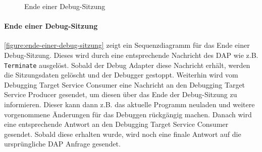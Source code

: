 \begin{figure}[tbp]
    \centering
    \caption{Ende einer Debug-Sitzung}
    \label{figure:ende-einer-debug-sitzung}
\end{figure}

\paragraph{Ende einer Debug-Sitzung} \autoref{figure:ende-einer-debug-sitzung} zeigt ein Sequenzdiagramm für das Ende einer Debug-Sitzung. Dieses wird durch eine entsprechende Nachricht des \ac{DAP} wie z.B. \texttt{Terminate} ausgelöst. Sobald der Debug Adapter diese Nachricht erhält, werden die Sitzungsdaten gelöscht und der Debugger gestoppt. Weiterhin wird vom Debugging Target Service Consumer eine Nachricht an den Debugging Target Service Producer gesendet, um diesen über das Ende der Debug-Sitzung zu informieren. Dieser kann dann z.B. das aktuelle Programm neuladen und weitere vorgenommene Änderungen für das Debuggen rückgängig machen. Danach wird eine entsprechende Antwort an den Debugging Target Service Consumer gesendet. Sobald diese erhalten wurde, wird noch eine finale Antwort auf die ursprüngliche \ac{DAP} Anfrage gesendet.

